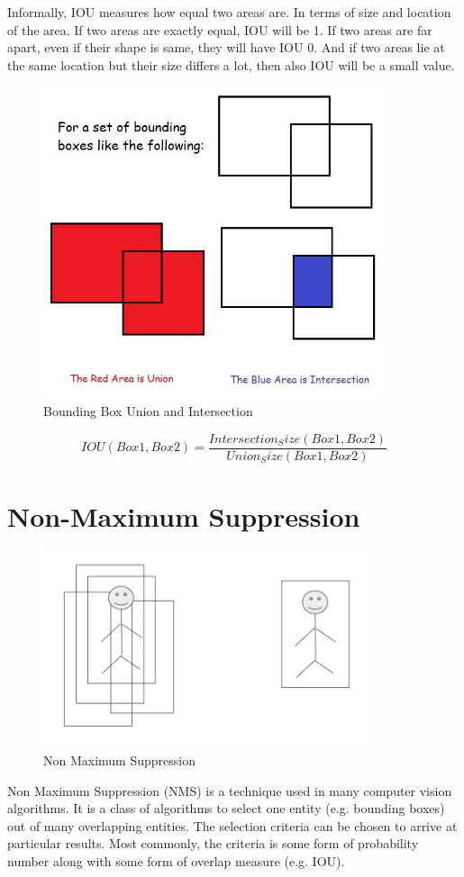             Informally, IOU measures how equal two areas are. In terms of size and location of the area. If two areas are exactly equal, IOU will be 1. If two areas are far apart, even if their shape is same, they will have IOU 0. And if two areas lie at the same location but their size differs a lot, then also IOU will be a small value.\cite{sheremet_2020}
            \begin{figure}[ht]
                \centering
                \includegraphics[width=0.90\textwidth]{img/IOU_2.jpg}
                \caption{Bounding Box Union and Intersection}
            \end{figure}
            $$ IOU(Box1, Box2) = \frac{Intersection_Size(Box1, Box2)}{Union_Size(Box1, Box2)}  $$
            \pagebreak
        \section{Non-Maximum Suppression}
            \begin{figure}[ht]
                \centering
                \includegraphics[width=0.85\textwidth]{img/NMS_2.png}
                \caption{Non Maximum Suppression}
            \end{figure}
            Non Maximum Suppression (NMS) is a technique used in many computer vision algorithms. It is a class of algorithms to select one entity (e.g. bounding boxes) out of many overlapping entities. The selection criteria can be chosen to arrive at particular results. Most commonly, the criteria is some form of probability number along with some form of overlap measure (e.g. IOU). 

